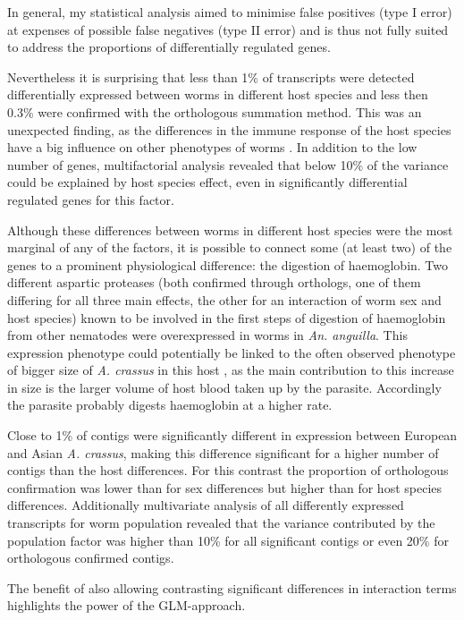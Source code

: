 \documentclass[10pt]{article}
\begin{document}
In general, my statistical analysis aimed to minimise false positives
(type I error) at expenses of possible false negatives (type II error)
and is thus not fully suited to address the proportions of
differentially regulated genes.

Nevertheless it is surprising that less than 1\% of transcripts were
detected differentially expressed between worms in different host
species and less then 0.3\% were confirmed with the orthologous
summation method. This was an unexpected finding, as the differences
in the immune response of the host species have a big influence on
other phenotypes of worms \cite{knopf_swimbladder_2006}. In addition
to the low number of genes, multifactorial analysis revealed that
below 10\% of the variance could be explained by host species effect,
even in significantly differential regulated genes for this factor.

Although these differences between worms in different host species
were the most marginal of any of the factors, it is possible to
connect some (at least two) of the genes to a prominent physiological
difference: the digestion of haemoglobin. Two different aspartic
proteases (both confirmed through orthologs, one of them differing for
all three main effects, the other for an interaction of worm sex and
host species) known to be involved in the first steps of digestion of
haemoglobin from other nematodes \cite{pmid12782060} were
overexpressed in worms in \textit{An. anguilla}. This expression
phenotype could potentially be linked to the often observed phenotype
of bigger size of \textit{A. crassus} in this host
\cite{knopf_swimbladder_2006}, as the main contribution to this
increase in size is the larger volume of host blood taken up by the
parasite. Accordingly the parasite probably digests haemoglobin at a
higher rate.

Close to 1\% of contigs were significantly different in expression
between European and Asian \textit{A. crassus}, making this difference
significant for a higher number of contigs than the host
differences. For this contrast the proportion of orthologous
confirmation was lower than for sex differences but higher than for
host species differences. Additionally multivariate analysis of all
differently expressed transcripts for worm population revealed that
the variance contributed by the population factor was higher than 10\%
for all significant contigs or even 20\% for orthologous confirmed
contigs.


The benefit of also allowing contrasting significant differences in
interaction terms highlights the power of the GLM-approach.
\end{document}
